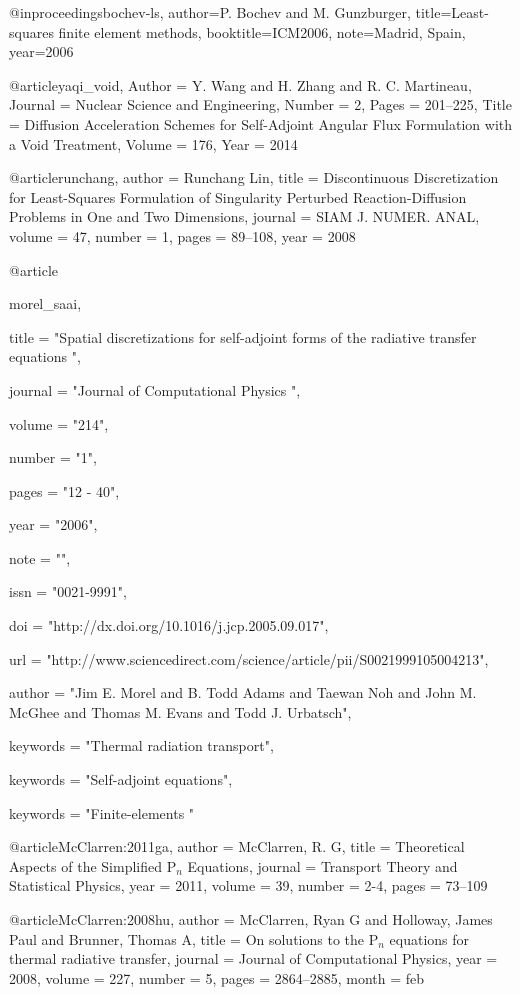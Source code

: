@inproceedings{bochev-ls,
	author={P. Bochev and M. Gunzburger},
	title={{Least-squares finite element methods}},
	booktitle={ICM2006},
	note={Madrid, Spain},
	year={2006}
}

@article{yaqi_void,
	Author = {Y. Wang and H. Zhang and R. C. Martineau},
	Journal = {Nuclear Science and Engineering},
	Number = {2},
	Pages = {201--225},
	Title = {{Diffusion Acceleration Schemes for Self-Adjoint Angular Flux Formulation with a Void Treatment}},
	Volume = {176},
	Year = {2014}}

@article{runchang,
	author = {Runchang Lin},
	title = {{Discontinuous Discretization for Least-Squares Formulation of Singularity Perturbed Reaction-Diffusion Problems in One and Two Dimensions}},
	journal = {SIAM J. NUMER. ANAL},
	volume = {47},
	number = {1},
	pages = {89--108},
	year = {2008}
}

@article{morel_saai,

title = "Spatial discretizations for self-adjoint forms of the radiative transfer equations ",

journal = "Journal of Computational Physics ",

volume = "214",

number = "1",

pages = "12 - 40",

year = "2006",

note = "",

issn = "0021-9991",

doi = "http://dx.doi.org/10.1016/j.jcp.2005.09.017",

url = "http://www.sciencedirect.com/science/article/pii/S0021999105004213",

author = "Jim E. Morel and B. Todd Adams and Taewan Noh and John M. McGhee and Thomas M. Evans and Todd J. Urbatsch",

keywords = "Thermal radiation transport",

keywords = "Self-adjoint equations",

keywords = "Finite-elements "

}





@article{McClarren:2011ga,
author = {McClarren, R. G},
title = {{Theoretical Aspects of the Simplified P$_n$ Equations}},
journal = {Transport Theory and Statistical Physics},
year = {2011},
volume = {39},
number = {2-4},
pages = {73--109}
}


@article{McClarren:2008hu,
author = {McClarren, Ryan G and Holloway, James Paul and Brunner, Thomas A},
title = {{On solutions to the P$_n$ equations for thermal radiative transfer}},
journal = {Journal of Computational Physics},
year = {2008},
volume = {227},
number = {5},
pages = {2864--2885},
month = feb
}

